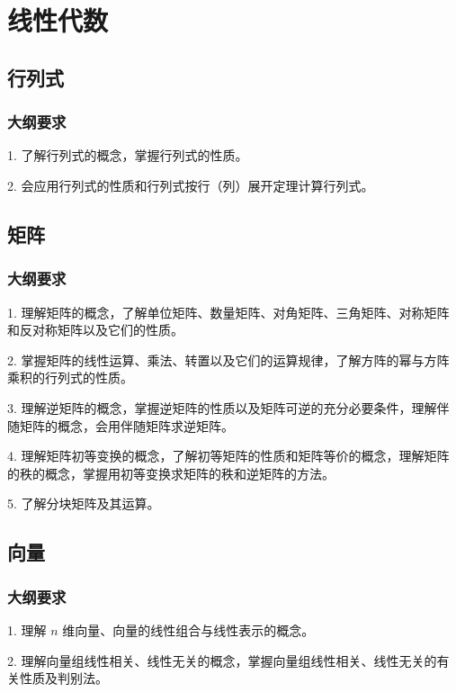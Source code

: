 \chapter{线性代数}

\section{行列式}

\subsection{大纲要求}

1. 了解行列式的概念，掌握行列式的性质。

2. 会应用行列式的性质和行列式按行（列）展开定理计算行列式。


\section{矩阵}

\subsection{大纲要求}

1. 理解矩阵的概念，了解单位矩阵、数量矩阵、对角矩阵、三角矩阵、对称矩阵和反对称矩阵以及它们的性质。

2. 掌握矩阵的线性运算、乘法、转置以及它们的运算规律，了解方阵的幂与方阵乘积的行列式的性质。

3. 理解逆矩阵的概念，掌握逆矩阵的性质以及矩阵可逆的充分必要条件，理解伴随矩阵的概念，会用伴随矩阵求逆矩阵。

4. 理解矩阵初等变换的概念，了解初等矩阵的性质和矩阵等价的概念，理解矩阵的秩的概念，掌握用初等变换求矩阵的秩和逆矩阵的方法。

5. 了解分块矩阵及其运算。


\section{向量}

\subsection{大纲要求}

1. 理解 $n$ 维向量、向量的线性组合与线性表示的概念。

2. 理解向量组线性相关、线性无关的概念，掌握向量组线性相关、线性无关的有关性质及判别法。

